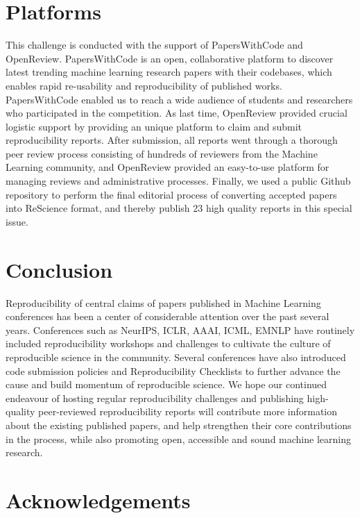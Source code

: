 \section{Platforms}

This challenge is conducted with the support of PapersWithCode and OpenReview. PapersWithCode is an open, collaborative platform to discover latest trending machine learning research papers with their codebases, which enables rapid re-usability and reproducibility of published works. PapersWithCode enabled us to reach a wide audience of students and researchers who participated in the competition. As last time, OpenReview provided crucial logistic support by providing an unique platform to claim and submit reproducibility reports. After submission, all reports went through a thorough peer review process consisting of hundreds of reviewers from the Machine Learning community, and OpenReview provided an easy-to-use platform for managing reviews and administrative processes. Finally, we used a public Github repository to perform the final editorial process of converting accepted papers into ReScience format, and thereby publish 23 high quality reports in this special issue.


\section{Conclusion}

Reproducibility of central claims of papers published in Machine Learning conferences has been a center of considerable attention over the past several years. Conferences such as NeurIPS, ICLR, AAAI, ICML, EMNLP have routinely included reproducibility workshops and challenges to cultivate the culture of reproducible science in the community. Several conferences have also introduced code submission policies and Reproducibility Checklists to further advance the cause and build momentum of reproducible science. We hope our continued endeavour of hosting regular reproducibility challenges and publishing high-quality peer-reviewed reproducibility reports will contribute more information about the existing published papers, and help strengthen their core contributions in the process, while also promoting open, accessible and sound machine learning research.

\section{Acknowledgements}

